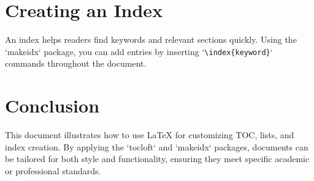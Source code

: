 \documentclass[12pt]{report}
\begin{document}
\chapter{Creating an Index}
An index helps readers find keywords and relevant sections quickly. Using the `makeidx` package, you can add entries by inserting `\texttt{\textbackslash index\{keyword\}}` commands throughout the document.

\chapter{Conclusion}
This document illustrates how to use LaTeX for customizing TOC, lists, and index creation. By applying the `tocloft` and `makeidx` packages, documents can be tailored for both style and functionality, ensuring they meet specific academic or professional standards.

\printindex %
\end{document}
